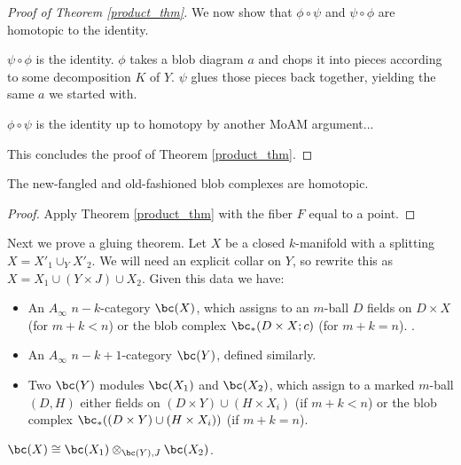 \begin{proof}[Proof of Theorem \ref{product_thm}]

We now show that $\phi\circ\psi$ and $\psi\circ\phi$ are homotopic to the identity.

$\psi\circ\phi$ is the identity.  $\phi$ takes a blob diagram $a$ and chops it into pieces 
according to some decomposition $K$ of $Y$.
$\psi$ glues those pieces back together, yielding the same $a$ we started with.

$\phi\circ\psi$ is the identity up to homotopy by another MoAM argument...

This concludes the proof of Theorem \ref{product_thm}.
\end{proof}


\medskip

\begin{cor}
\label{cor:new-old}
The new-fangled and old-fashioned blob complexes are homotopic.
\end{cor}
\begin{proof}
Apply Theorem \ref{product_thm} with the fiber $F$ equal to a point.
\end{proof}

\medskip

Next we prove a gluing theorem.
Let $X$ be a closed $k$-manifold with a splitting $X = X'_1\cup_Y X'_2$.
We will need an explicit collar on $Y$, so rewrite this as
$X = X_1\cup (Y\times J) \cup X_2$.
Given this data we have: 
\begin{itemize}
\item An $A_\infty$ $n{-}k$-category $\bc(X)$, which assigns to an $m$-ball
$D$ fields on $D\times X$ (for $m+k < n$) or the blob complex $\bc_*(D\times X; c)$
(for $m+k = n$). .
\item An $A_\infty$ $n{-}k{+}1$-category $\bc(Y)$, defined similarly.
\item Two $\bc(Y)$ modules $\bc(X_1)$ and $\bc(X_2)$, which assign to a marked
$m$-ball $(D, H)$ either fields on $(D\times Y) \cup (H\times X_i)$ (if $m+k < n$)
or the blob complex $\bc_*((D\times Y) \cup (H\times X_i))$ (if $m+k = n$).
\end{itemize}

\begin{thm}
$\bc(X) \cong \bc(X_1) \otimes_{\bc(Y), J} \bc(X_2)$.
\end{thm}

